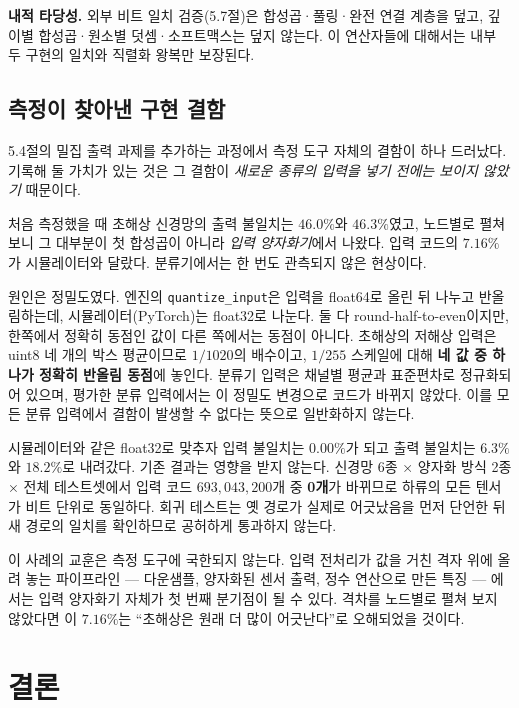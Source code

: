 \documentclass[11pt,a4paper,oneside]{report}
\begin{document}
\textbf{내적 타당성.} 외부 비트 일치 검증(5.7절)은 합성곱·풀링·완전 연결 계층을 덮고, 깊이별
합성곱·원소별 덧셈·소프트맥스는 덮지 않는다. 이 연산자들에 대해서는 내부 두 구현의 일치와 직렬화 왕복만
보장된다.

\section{측정이 찾아낸 구현 결함}

5.4절의 밀집 출력 과제를 추가하는 과정에서 측정 도구 자체의 결함이 하나 드러났다. 기록해 둘 가치가 있는
것은 그 결함이 \emph{새로운 종류의 입력을 넣기 전에는 보이지 않았기} 때문이다.

처음 측정했을 때 초해상 신경망의 출력 불일치는 $46.0\%$와 $46.3\%$였고, 노드별로 펼쳐 보니 그 대부분이 첫
합성곱이 아니라 \emph{입력 양자화기}에서 나왔다. 입력 코드의 $7.16\%$가 시뮬레이터와 달랐다. 분류기에서는
한 번도 관측되지 않은 현상이다.

원인은 정밀도였다. 엔진의 \texttt{quantize\_input}은 입력을 float64로 올린 뒤 나누고 반올림하는데,
시뮬레이터(PyTorch)는 float32로 나눈다. 둘 다 round-half-to-even이지만, 한쪽에서 정확히 동점인 값이 다른
쪽에서는 동점이 아니다. 초해상의 저해상 입력은 uint8 네 개의 박스 평균이므로 $1/1020$의 배수이고, $1/255$
스케일에 대해 \textbf{네 값 중 하나가 정확히 반올림 동점}에 놓인다. 분류기 입력은 채널별 평균과 표준편차로
정규화되어 있으며, 평가한 분류 입력에서는 이 정밀도 변경으로 코드가 바뀌지 않았다.
이를 모든 분류 입력에서 결함이 발생할 수 없다는 뜻으로 일반화하지 않는다.

시뮬레이터와 같은 float32로 맞추자 입력 불일치는 $0.00\%$가 되고 출력 불일치는 $6.3\%$와 $18.2\%$로
내려갔다. 기존 결과는 영향을 받지 않는다. 신경망 6종 × 양자화 방식 2종 × 전체 테스트셋에서 입력 코드
$693{,}043{,}200$개 중 \textbf{0개}가 바뀌므로 하류의 모든 텐서가 비트 단위로 동일하다. 회귀 테스트는 옛
경로가 실제로 어긋났음을 먼저 단언한 뒤 새 경로의 일치를 확인하므로 공허하게 통과하지 않는다.

이 사례의 교훈은 측정 도구에 국한되지 않는다. 입력 전처리가 값을 거친 격자 위에 올려 놓는 파이프라인
--- 다운샘플, 양자화된 센서 출력, 정수 연산으로 만든 특징 --- 에서는 입력 양자화기 자체가 첫 번째 분기점이
될 수 있다. 격차를 노드별로 펼쳐 보지 않았다면 이 $7.16\%$는 ``초해상은 원래 더 많이 어긋난다''로
오해되었을 것이다.

\chapter{결론}
\end{document}
